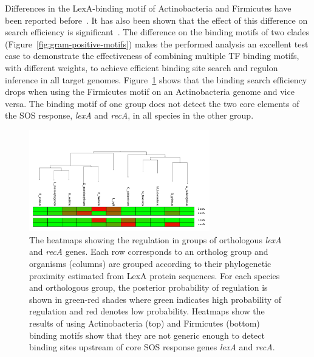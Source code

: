 \documentclass[12pt]{article}
\begin{document}
Differences in the LexA-binding motif of Actinobacteria and Firmicutes have
been reported before~\cite{jochmann2009genetic, van2010sos,
  davis2002definition}. It has also been shown that the effect of this
difference on search efficiency is significant~\cite{cornish2012inference}. The
difference on the binding motifs of two clades
(Figure~\ref{fig:gram-positive-motifs}) makes the performed analysis an
excellent test case to demonstrate the effectiveness of combining multiple TF
binding motifs, with different weights, to achieve efficient binding site
search and regulon inference in all target genomes.  Figure~\ref{fig:heatmap_1}
shows that the binding search efficiency drops when using the Firmicutes motif
on an Actinobacteria genome and vice versa. The binding motif of one group does
not detect the two core elements of the SOS response, \textit{lexA} and
\textit{recA}, in all species in the other group.

\begin{figure}
  \centering
  \includegraphics[width=0.7\textwidth]{figures/chapter4/heatmap_single_motif}
  \caption{The heatmaps showing the regulation in groups of orthologous
    \textit{lexA} and \textit{recA} genes. Each row corresponds to an ortholog
    group and organisms (columns) are grouped according to their phylogenetic
    proximity estimated from LexA protein sequences. For each species and
    orthologous group, the posterior probability of regulation is shown in
    green-red shades where green indicates high probability of regulation and
    red denotes low probability. Heatmaps show the results of using
    Actinobacteria (top) and Firmicutes (bottom) binding motifs show that they
    are not generic enough to detect binding sites upstream of core SOS
    response genes \textit{lexA} and \textit{recA}.}
  \label{fig:heatmap_1}
\end{figure}
\end{document}
